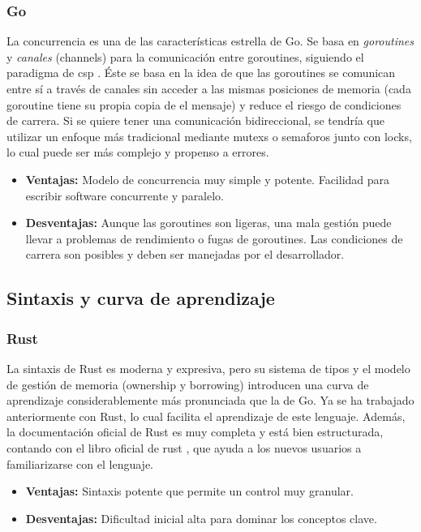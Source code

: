 \subsubsection{Go}

La concurrencia es una de las características estrella de Go. Se basa en \textit{goroutines} y \textit{canales} (channels) para la comunicación entre goroutines, siguiendo el paradigma de \acrfull{csp} \parencite{communicating-sequential-processes}.
Éste se basa en la idea de que las goroutines se comunican entre sí a través de canales sin acceder a las mismas posiciones de memoria (cada goroutine tiene su propia copia de el mensaje) y reduce el riesgo de condiciones de carrera.
Si se quiere tener una comunicación bidireccional, se tendría que utilizar un enfoque más tradicional mediante \glspl{mutex} o \glspl{semaforo} junto con \glspl{lock}, lo cual puede ser más complejo y propenso a errores.
\begin{itemize}
    \item \textbf{Ventajas:} Modelo de concurrencia muy simple y potente. Facilidad para escribir software concurrente y paralelo.
    \item \textbf{Desventajas:} Aunque las goroutines son ligeras, una mala gestión puede llevar a problemas de rendimiento o fugas de goroutines. Las condiciones de carrera son posibles y deben ser manejadas por el desarrollador.
\end{itemize}

\subsection{Sintaxis y curva de aprendizaje}
\subsubsection{Rust}
La sintaxis de Rust es moderna y expresiva, pero su sistema de tipos y el modelo de gestión de memoria (ownership y borrowing) introducen una curva de aprendizaje considerablemente más pronunciada que la de Go.
Ya se ha trabajado anteriormente con Rust, lo cual facilita el aprendizaje de este lenguaje.
Además, la documentación oficial de Rust es muy completa y está bien estructurada, contando con el libro oficial de rust \parencite{rustbook2024}, que ayuda a los nuevos usuarios a familiarizarse con el lenguaje.
\begin{itemize}
    \item \textbf{Ventajas:} Sintaxis potente que permite un control muy granular.
    \item \textbf{Desventajas:} Dificultad inicial alta para dominar los conceptos clave.
\end{itemize}

